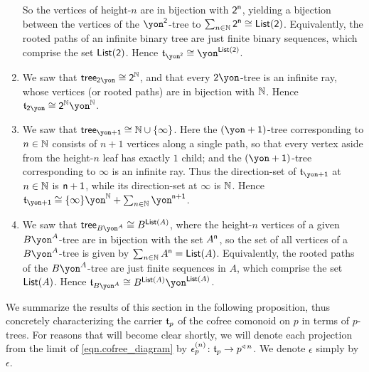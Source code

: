 \documentclass[Book-Poly]{subfiles}
\begin{document}
\begin{exercise}
\begin{solution}
\begin{enumerate}
    So the vertices of height-$n$ are in bijection with $\textsf{2}^{\mathsf{n}}$, yielding a bijection between the vertices of the $\yon^\2$-tree to $\sum_{n\in\mathbb{N}}\textsf{2}^{\mathsf{n}}\cong\mathsf{List}(\textsf{2})$.
    Equivalently, the rooted paths of an infinite binary tree are just finite binary sequences, which comprise the set $\mathsf{List}(\textsf{2})$.
    Hence $\car{t}_{\yon^\2}\iso\yon^{\lst(\2)}$.
    \item We saw that $\tr_{\2\yon}\iso\2^\nn$, and that every $2\yon$-tree is an infinite ray, whose vertices (or rooted paths) are in bijection with $\mathbb{N}$.
    Hence $\car{t}_{\2\yon}\iso\2^\nn\yon^\nn$.
    \item We saw that $\tr_{\yon+\1}\iso\nn\cup\{\infty\}$.
    Here the $(\yon+\1)$-tree corresponding to $n\in\mathbb{N}$ consists of $n+1$ vertices along a single path, so that every vertex aside from the height-$n$ leaf has exactly $1$ child; and the $(\yon+\1)$-tree corresponding to $\infty$ is an infinite ray.
    Thus the direction-set of $\car{t}_{\yon+\1}$ at $n\in\mathbb{N}$ is $\mathsf{n}+\textsf{1}$, while its direction-set at $\infty$ is $\mathbb{N}$.
    Hence $\car{t}_{\yon+\1}\iso\{\infty\}\yon^\nn+\sum_{n\in\nn}\yon^{\ord{n}+\1}$.
    \item We saw that $\tr_{B\yon^A}\iso B^{\lst(A)}$, where the height-$n$ vertices of a given $B\yon^A$-tree are in bijection with the set $A^{\mathsf{n}}$, so the set of all vertices of a $B\yon^A$-tree is given by $\sum_{n\in\mathbb{N}}A^{\mathsf{n}}=\mathsf{List}(A)$.
    Equivalently, the rooted paths of the $B\yon^A$-tree are just finite sequences in $A$, which comprise the set $\mathsf{List}(A)$.
    Hence $\car{t}_{B\yon^A}\iso B^{\lst(A)}\yon^{\lst(A)}$.
\end{enumerate}
\end{solution}
\end{exercise}

We summarize the results of this section in the following proposition, thus concretely characterizing the carrier $\mathfrak{t}_p$ of the cofree comonoid on $p$ in terms of $p$-trees.
For reasons that will become clear shortly, we will denote each projection from the limit of \eqref{eqn.cofree_diagram} by $\epsilon^{(n)}_p\colon\mathfrak{t}_p\to p^{\mathbin{\triangleleft}\,n}$. We denote $\epsilon$ simply by $\epsilon$.
\end{document}
